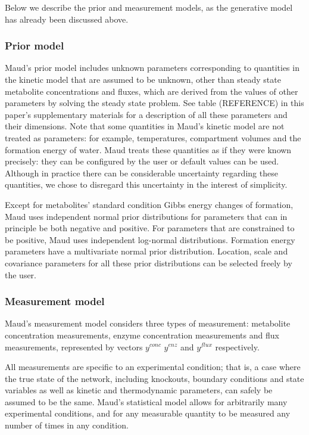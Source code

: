 \documentclass[journal=asbcd6,manuscript=article,layout=traditional]{achemso}
\begin{document}
Below we describe the prior and measurement models, as the generative
model has already been discussed above.

\hypertarget{prior-model}{%
\subsubsection{Prior model}\label{prior-model}}

Maud's prior model includes unknown parameters corresponding to
quantities in the kinetic model that are assumed to be unknown, other
than steady state metabolite concentrations and fluxes, which are
derived from the values of other parameters by solving the steady state
problem. See table (REFERENCE) in this paper's supplementary materials
for a description of all these parameters and their dimensions. Note
that some quantities in Maud's kinetic model are not treated as
parameters: for example, temperatures, compartment volumes and the
formation energy of water. Maud treats these quantities as if they were
known precisely: they can be configured by the user or default values
can be used. Although in practice there can be considerable uncertainty
regarding these quantities, we chose to disregard this uncertainty in
the interest of simplicity.

Except for metabolites' standard condition Gibbs energy changes of
formation, Maud uses independent normal prior distributions for
parameters that can in principle be both negative and positive. For
parameters that are constrained to be positive, Maud uses independent
log-normal distributions. Formation energy parameters have a
multivariate normal prior distribution. Location, scale and covariance
parameters for all these prior distributions can be selected freely by
the user.

\hypertarget{measurement-model}{%
\subsubsection{Measurement model}\label{measurement-model}}

Maud's measurement model considers three types of measurement:
metabolite concentration measurements, enzyme concentration measurements
and flux measurements, represented by vectors \(𝑦^{𝑐𝑜𝑛𝑐}\) \(𝑦^{𝑒𝑛𝑧}\)
and \(𝑦^{𝑓𝑙𝑢𝑥}\) respectively.

All measurements are specific to an experimental condition; that is, a
case where the true state of the network, including knockouts, boundary
conditions and state variables as well as kinetic and thermodynamic
parameters, can safely be assumed to be the same. Maud's statistical
model allows for arbitrarily many experimental conditions, and for any
measurable quantity to be measured any number of times in any condition.
\end{document}
